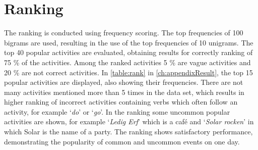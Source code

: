 \section{Ranking}\label{sec:res_ranking}
The ranking is conducted using frequency scoring. The top frequencies of 100 bigrams are used, resulting in the use of the top frequencies of 10 unigrams. The top 40 popular activities are evaluated, obtaining results for correctly ranking of 75 \% of the activities. Among the ranked activities 5 \% are vague activities and 20 \% are not correct activities. In \autoref{table:rank} in \autoref{ch:appendixResult}, the top 15 popular activities are displayed, also showing their frequencies. There are not many activities mentioned more than 5 times in the data set, which results in higher ranking of incorrect activities containing verbs which often follow an activity, for example `\textit{do}' or `\textit{go}'. In the ranking some uncommon popular activities are shown, for example `\textit{Ledig Erf}' which is a caf\'e and `\textit{Solar rocken}' in which Solar is the name of a party. The ranking shows satisfactory performance, demonstrating the popularity of common and uncommon events on one day. 
\fi